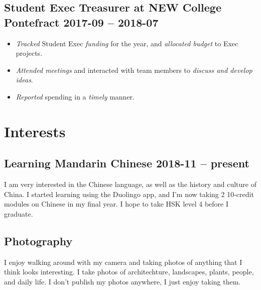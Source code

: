 \documentclass[cv.tex]{subfiles}
\begin{document}
    \subsection{Student Exec Treasurer at NEW College Pontefract
    \hfill 2017-09 -- 2018-07}
        \begin{itemize}
            \item \emph{Tracked} Student Exec \emph{funding} for the year,
                and \emph{allocated budget} to Exec projects.
            \item \emph{Attended
                meetings} and interacted with team members to
                \emph{discuss and develop ideas}.
            \item \emph{Reported} spending in a \emph{timely} manner.
        \end{itemize}

\section*{Interests}
\subsection*{Learning Mandarin Chinese \hfill 2018-11 -- present}
I am very interested in the Chinese language, as well as the history and
culture of China. I started learning using the Duolingo app, and I'm now taking
2 10-credit modules on Chinese in my final year. I hope to take HSK level 4
before I graduate.

\subsection*{Photography}
I enjoy walking around with my camera and taking photos of anything that I
think looks interesting. I take photos of architechture, landscapes, plants,
people, and daily life. I don't publish my photos anywhere, I just enjoy taking
them.

\end{document}
